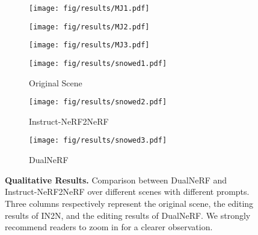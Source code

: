 \begin{figure*}
    \begin{subfigure}{0.33\linewidth}
        \begin{minipage}[t]{1.0\linewidth}
            \centering
            \texttt{[image: fig/results/MJ1.pdf]}
        \end{minipage}
    \end{subfigure}
    \hfill
    \begin{subfigure}{0.33\linewidth}
        \begin{minipage}[t]{1.0\linewidth}
            \centering
            \texttt{[image: fig/results/MJ2.pdf]}
        \end{minipage}
    \end{subfigure}
    \hfill
    \begin{subfigure}{0.33\linewidth}
        \begin{minipage}[t]{1.0\linewidth}
            \centering
            \texttt{[image: fig/results/MJ3.pdf]}
        \end{minipage}
    \end{subfigure}

    \begin{subfigure}{0.33\linewidth}
        \begin{minipage}[t]{1.0\linewidth}
            \centering
            \texttt{[image: fig/results/snowed1.pdf]}
            \caption{Original Scene}
        \end{minipage}
    \end{subfigure}
    \hfill
    \begin{subfigure}{0.33\linewidth}
        \begin{minipage}[t]{1.0\linewidth}
            \centering
            \texttt{[image: fig/results/snowed2.pdf]}
            \caption{Instruct-NeRF2NeRF}
        \end{minipage}
    \end{subfigure}
    \hfill
    \begin{subfigure}{0.33\linewidth}
        \begin{minipage}[t]{1.0\linewidth}
            \centering
            \texttt{[image: fig/results/snowed3.pdf]}
            \caption{DualNeRF}
        \end{minipage}
    \end{subfigure}
  
    \caption{\textbf{Qualitative Results.} Comparison between DualNeRF and Instruct-NeRF2NeRF \cite{haque2023instruct} over different scenes with different prompts. Three columns respectively represent the original scene, the editing results of IN2N, and the editing results of DualNeRF. We strongly recommend readers to zoom in for a clearer observation.}
    \label{fig: qualitative results}
\end{figure*}

